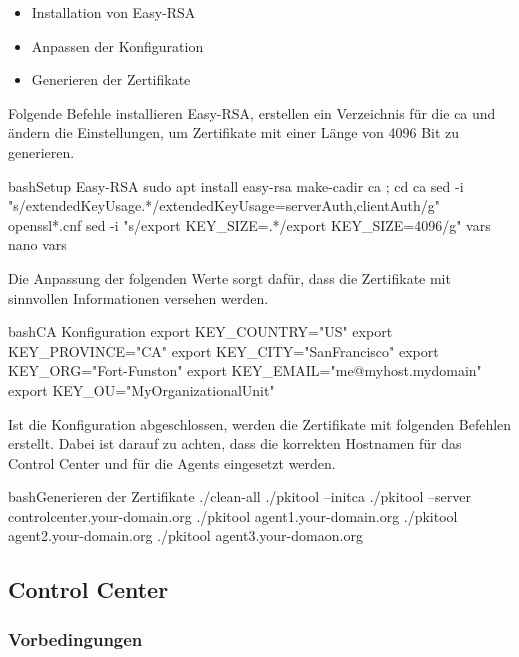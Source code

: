 \begin{itemize}
    \item Installation von Easy-RSA
    \item Anpassen der Konfiguration
    \item Generieren der Zertifikate
\end{itemize}

Folgende Befehle installieren Easy-RSA, erstellen ein Verzeichnis für die \gls{ca} und ändern die Einstellungen, um Zertifikate mit einer Länge von 4096 Bit zu generieren.

\begin{srclst}[label=lst:ca:installation1]{bash}{Setup Easy-RSA}
sudo apt install easy-rsa
make-cadir ca ; cd ca
sed -i "s/extendedKeyUsage.*/extendedKeyUsage=serverAuth,clientAuth/g" openssl*.cnf
sed -i "s/export KEY_SIZE=.*/export KEY_SIZE=4096/g" vars
nano vars
\end{srclst}

Die Anpassung der folgenden Werte sorgt dafür, dass die Zertifikate mit sinnvollen Informationen versehen werden.

\begin{srclst}[label=lst:ca:installation2]{bash}{CA Konfiguration}
export KEY_COUNTRY="US"
export KEY_PROVINCE="CA"
export KEY_CITY="SanFrancisco"
export KEY_ORG="Fort-Funston"
export KEY_EMAIL="me@myhost.mydomain"
export KEY_OU="MyOrganizationalUnit"
\end{srclst}

Ist die Konfiguration abgeschlossen, werden die Zertifikate mit folgenden Befehlen erstellt. Dabei ist darauf zu achten, dass die korrekten Hostnamen für das Control Center und für die Agents eingesetzt werden.

\begin{srclst}[label=lst:ca:installation3]{bash}{Generieren der Zertifikate}
./clean-all
./pkitool --initca
./pkitool --server controlcenter.your-domain.org
./pkitool agent1.your-domain.org
./pkitool agent2.your-domain.org
./pkitool agent3.your-domaon.org
\end{srclst}

\subsection*{Control Center}

\subsubsection*{Vorbedingungen}

